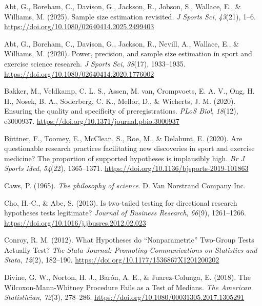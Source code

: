 \documentclass[
]{article}
\newlength{\cslhangindent}
\newenvironment{CSLReferences}[2] %
 {\begin{list}{}{%
  \setlength{\itemindent}{0pt}
  \setlength{\leftmargin}{0pt}
  \setlength{\parsep}{0pt}
  \ifodd #1
   \setlength{\leftmargin}{\cslhangindent}
   \setlength{\itemindent}{-1\cslhangindent}
  \fi
  \setlength{\itemsep}{#2\baselineskip}}}
 {\end{list}}
\begin{document}
\protect{}\label{refs}
\begin{CSLReferences}{1}{0}
Abt, G., Boreham, C., Davison, G., Jackson, R., Jobson, S., Wallace, E.,
\& Williams, M. (2025). Sample size estimation revisited. \emph{J Sports
Sci}, \emph{43}(21), 1--6.
\url{https://doi.org/10.1080/02640414.2025.2499403}

Abt, G., Boreham, C., Davison, G., Jackson, R., Nevill, A., Wallace, E.,
\& Williams, M. (2020). Power, precision, and sample size estimation in
sport and exercise science research. \emph{J Sports Sci}, \emph{38}(17),
1933--1935. \url{https://doi.org/10.1080/02640414.2020.1776002}

Bakker, M., Veldkamp, C. L. S., Assen, M. van, Crompvoets, E. A. V.,
Ong, H. H., Nosek, B. A., Soderberg, C. K., Mellor, D., \& Wicherts, J.
M. (2020). Ensuring the quality and specificity of preregistrations.
\emph{PLoS Biol}, \emph{18}(12), e3000937.
\url{https://doi.org/10.1371/journal.pbio.3000937}

Büttner, F., Toomey, E., McClean, S., Roe, M., \& Delahunt, E. (2020).
Are questionable research practices facilitating new discoveries in
sport and exercise medicine? {The} proportion of supported hypotheses is
implausibly high. \emph{Br J Sports Med}, \emph{54}(22), 1365--1371.
\url{https://doi.org/10.1136/bjsports-2019-101863}

Caws, P. (1965). \emph{The philosophy of science}. D. Van Norstrand
Company Inc.

Cho, H.-C., \& Abe, S. (2013). Is two-tailed testing for directional
research hypotheses tests legitimate? \emph{Journal of Business
Research}, \emph{66}(9), 1261--1266.
\url{https://doi.org/10.1016/j.jbusres.2012.02.023}

Conroy, R. M. (2012). What {Hypotheses} do {``{Nonparametric}''}
{Two}-{Group} {Tests} {Actually} {Test}? \emph{The Stata Journal:
Promoting Communications on Statistics and Stata}, \emph{12}(2),
182--190. \url{https://doi.org/10.1177/1536867X1201200202}

Divine, G. W., Norton, H. J., Barón, A. E., \& Juarez-Colunga, E.
(2018). The {Wilcoxon}-{Mann}-{Whitney} {Procedure} {Fails} as a {Test}
of {Medians}. \emph{The American Statistician}, \emph{72}(3), 278--286.
\url{https://doi.org/10.1080/00031305.2017.1305291}


\end{CSLReferences}
\end{document}
